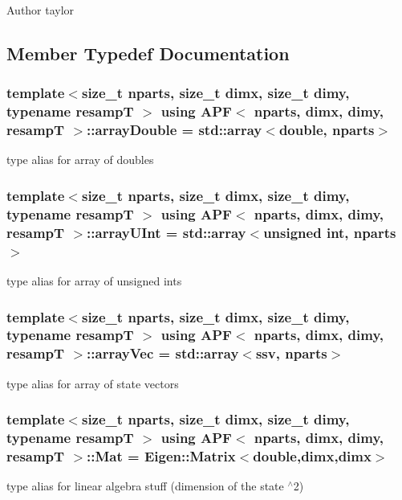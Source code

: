 \begin{DoxyAuthor}{Author}
taylor 
\end{DoxyAuthor}


\subsection{Member Typedef Documentation}
\subsubsection[{\texorpdfstring{array\+Double}{arrayDouble}}]{\setlength{\rightskip}{0pt plus 5cm}template$<$size\+\_\+t nparts, size\+\_\+t dimx, size\+\_\+t dimy, typename resampT $>$ using {\bf A\+PF}$<$ nparts, dimx, dimy, resampT $>$\+::{\bf array\+Double} =  std\+::array$<$double, nparts$>$}\hypertarget{classAPF_a004eb76b0bd0c79820674bdeb5a6c2c1}{}\label{classAPF_a004eb76b0bd0c79820674bdeb5a6c2c1}
type alias for array of doubles 
\subsubsection[{\texorpdfstring{array\+U\+Int}{arrayUInt}}]{\setlength{\rightskip}{0pt plus 5cm}template$<$size\+\_\+t nparts, size\+\_\+t dimx, size\+\_\+t dimy, typename resampT $>$ using {\bf A\+PF}$<$ nparts, dimx, dimy, resampT $>$\+::{\bf array\+U\+Int} =  std\+::array$<$unsigned int, nparts$>$}\hypertarget{classAPF_a43238fa97dbb1862121ea2aa6f2a9dd1}{}\label{classAPF_a43238fa97dbb1862121ea2aa6f2a9dd1}
type alias for array of unsigned ints 
\subsubsection[{\texorpdfstring{array\+Vec}{arrayVec}}]{\setlength{\rightskip}{0pt plus 5cm}template$<$size\+\_\+t nparts, size\+\_\+t dimx, size\+\_\+t dimy, typename resampT $>$ using {\bf A\+PF}$<$ nparts, dimx, dimy, resampT $>$\+::{\bf array\+Vec} =  std\+::array$<${\bf ssv}, nparts$>$}\hypertarget{classAPF_a58fdbb8fc5629feb9bb5fe9a9de19554}{}\label{classAPF_a58fdbb8fc5629feb9bb5fe9a9de19554}
type alias for array of state vectors 
\subsubsection[{\texorpdfstring{Mat}{Mat}}]{\setlength{\rightskip}{0pt plus 5cm}template$<$size\+\_\+t nparts, size\+\_\+t dimx, size\+\_\+t dimy, typename resampT $>$ using {\bf A\+PF}$<$ nparts, dimx, dimy, resampT $>$\+::{\bf Mat} =  Eigen\+::\+Matrix$<$double,dimx,dimx$>$}\hypertarget{classAPF_a8e867c46870835e2103aee00f13f0be7}{}\label{classAPF_a8e867c46870835e2103aee00f13f0be7}
type alias for linear algebra stuff (dimension of the state $^\wedge$2) 
